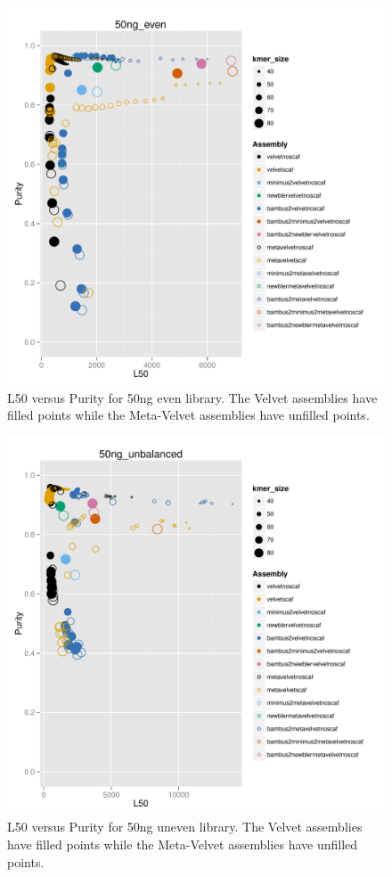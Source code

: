 \documentclass[a4paper,12pt]{article}
\begin{document}
\begin{figure}[ht!]
  \centering
    \includegraphics[width=\textwidth]{figures/l50-purity-50ng_even.pdf}
  \caption{L50 versus Purity for 50ng even library. The Velvet assemblies have filled points while the Meta-Velvet assemblies have unfilled points.}
  \label{fig:l50purity50ng_even}
\end{figure}
\begin{figure}[ht!]
  \centering
    \includegraphics[width=\textwidth]{figures/l50-purity-50ng_unbalanced.pdf}
  \caption{L50 versus Purity for 50ng uneven library. The Velvet assemblies have filled points while the Meta-Velvet assemblies have unfilled points.}
  \label{fig:l50purity50ng_uneven}
\end{figure}
\end{document}
